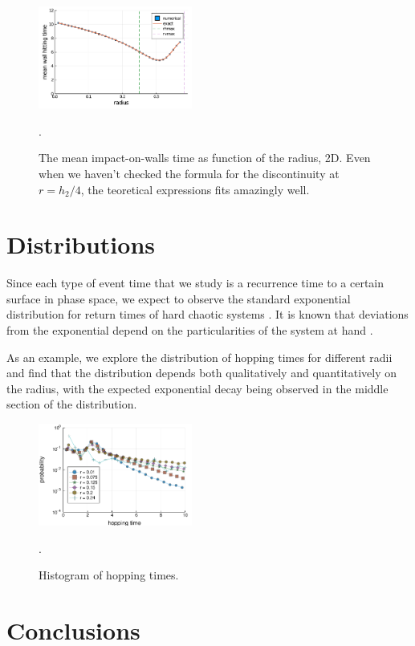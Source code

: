 \documentclass[superscriptaddress,pre,reprint,showpacs,twocolumn]{revtex4-1}
\begin{document}
\begin{figure}[h]
  \centering
  \includegraphics[width=0.45\textwidth]{./figures/wall3d.pdf}
  \caption{The mean impact-on-walls time as function of the radius, 2D.
    Even when we haven't checked the formula for
    the discontinuity at $r=h_2/4$, the teoretical expressions fits
    amazingly well.}
    \label{wall3d}.
\end{figure}


%
\section{Distributions}

Since each type of event time that we study is a recurrence time to a
certain surface in phase space, we expect to observe the standard
exponential distribution for return times of hard chaotic systems
\cite{Hirata1999}. It is known that deviations from the
exponential depend on the particularities of the system at hand
\cite{Altmann2005}.


As an example, we explore
the distribution of hopping times for different radii and find that the
distribution depends both qualitatively and quantitatively on the
radius, with the expected exponential decay being observed in the middle section
of the distribution. 


\begin{figure}[h]
  \centering
  \includegraphics[width=0.45\textwidth]{figures/histogram_hopping_times.pdf}
  \caption{Histogram of hopping times.}
    \label{histogram_hopping}.
\end{figure}


\section{Conclusions}
\end{document}
